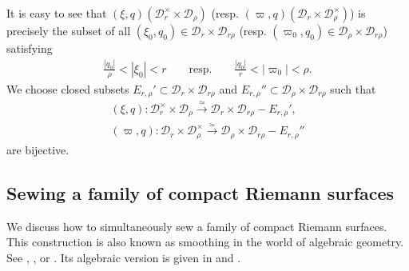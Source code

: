 \documentclass[11pt,b5paper,notitlepage]{article}
\theoremstyle{definition}
\theoremstyle{plain}
\newcommand{\mc}{\mathcal}
\numberwithin{equation}{section}
\begin{document}
It is easy to see that  $(\xi,q)(\mc D_r^\times\times\mc D_\rho)$ (resp. $(\varpi,q)(\mc D_r\times\mc D_\rho^\times)$) is precisely the subset of all $(\xi_0,q_0)\in\mc D_r\times\mc D_{r\rho}$ (resp. $(\varpi_0,q_0)\in\mc D_\rho\times\mc D_{r\rho}$) satisfying
\begin{align}
\frac{|q_0|}{\rho}<|\xi_0|<r\qquad\text{resp.}\qquad  \frac{|q_0|}{r}<|\varpi_0|<\rho.
\end{align}
We choose closed subsets $E_{r,\rho}'\subset \mc D_r\times\mc D_{r\rho}$ and $E_{r,\rho}''\subset\mc D_\rho\times\mc D_{r\rho}$ such that
\begin{gather}
(\xi,q):\mc D_r^\times\times\mc D_\rho\xrightarrow{\simeq}\mc D_r\times\mc D_{r\rho}-E_{r,\rho}',\nonumber\\
(\varpi,q): \mc D_r\times\mc D_\rho^\times\xrightarrow{\simeq}\mc D_\rho\times\mc D_{r\rho}-E_{r,\rho}''\label{eq11}
\end{gather}
are bijective.




\subsection*{Sewing a family of compact Riemann surfaces}

We discuss how to simultaneously sew a family of compact Riemann surfaces. This construction is also known as smoothing in the world of algebraic geometry. See \cite[Sec. 6.1]{TUY89}, \cite[Sec. 5.3]{Ueno97}, or \cite[Sec. XI.3]{ACG11}. Its algebraic version is given in \cite[Sec. 6]{Loo10} and \cite[Sec. 8.1]{DGT19b}.
\end{document}
